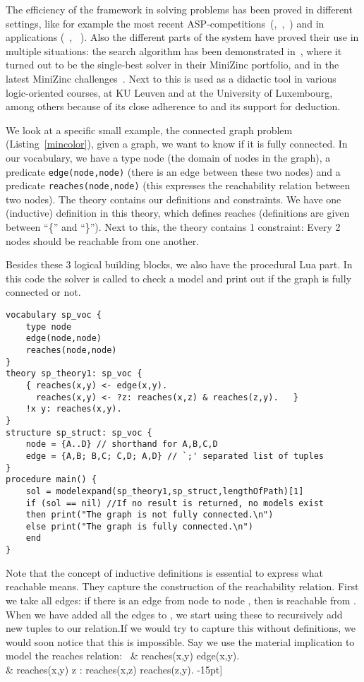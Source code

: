 \documentclass[runningheads]{llncs}
\newcommand{\logicname}[1]{\text{\sc #1}\xspace}
\newcommand{\idp}{\logicname{IDP}}
\newcommand{\minisatid}{\logicname{MiniSAT(ID)}}
\begin{document}
 The efficiency of the \idp framework in solving problems has been proved in different settings, like for example the most recent ASP-competitions~(\cite{ASP-Comp-2},~\cite{ASP-Comp-3},~\cite{conf/lpnmr/Alviano}) and in applications (~\cite{corr/Blockeel13}, ~\cite{iclp/VanHertum13}). Also the different parts of the system have proved their use in multiple situations: the search algorithm \minisatid has been demonstrated in~\cite{misc/amadini2013}, where it turned out to be the single-best solver in their MiniZinc portfolio, and in the latest MiniZinc challenges~\cite{url:MinizincChallenge2012}. Next to this \idp is used as a didactic tool in various logic-oriented courses, at KU Leuven and at the University of Luxembourg, among others because of its close adherence to \FO and its support for deduction.


We look at a specific small example, the connected graph problem (Listing~\ref{mincolor}), given a graph, we want to know if it is fully connected.
In our vocabulary, we have a type node (the domain of nodes in the graph), a predicate \texttt{edge(node,node)} (there is an edge between these two nodes) and a predicate \texttt{reaches(node,node)} (this expresses the reachability relation between two nodes).
The theory contains our definitions and constraints.
We have one (inductive) definition in this theory, which defines reaches (definitions are given between ``\{'' and ``\}'').
Next to this, the theory contains 1 constraint: Every 2 nodes should be reachable from one another.

Besides these 3 logical building blocks, we also have the procedural Lua part.
In this code the solver is called to check a model and print out if the graph is fully connected or not.

\begin{lstlisting}[caption={Calling main() solves the graph connectivity problem for the given data.},label={mincolor}]
vocabulary sp_voc {
    type node
    edge(node,node)
    reaches(node,node)
}
theory sp_theory1: sp_voc {
    { reaches(x,y) <- edge(x,y).
      reaches(x,y) <- ?z: reaches(x,z) & reaches(z,y).   }
    !x y: reaches(x,y).  
}
structure sp_struct: sp_voc {
    node = {A..D} // shorthand for A,B,C,D
    edge = {A,B; B,C; C,D; A,D} // `;' separated list of tuples
}
procedure main() {
    sol = modelexpand(sp_theory1,sp_struct,lengthOfPath)[1]
    if (sol == nil) //If no result is returned, no models exist
    then print("The graph is not fully connected.\n")
    else print("The graph is fully connected.\n")
    end
}
\end{lstlisting}
Note that the concept of inductive definitions is essential to express what reachable means. 
They capture the construction of the reachability relation. 
First we take all edges: if there is an edge from node  to node , then  is reachable from . 
When we have added all the edges to , we start using these to recursively add new tuples to our relation.If we would try to capture this without definitions, we would soon notice that this is impossible. Say we use the material implication to model the reaches relation:  \ 
  & reaches(x,y) \Leftarrow edge(x,y).\\
  & reaches(x,y) \Leftarrow \exists z : reaches(x,z) \land reaches(z,y).
-15pt]
\end{document}
